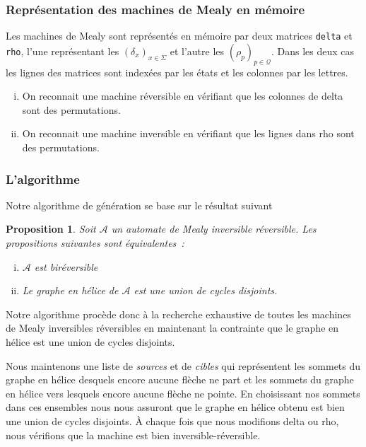 \documentclass[11pt,a4paper]{article}
\newtheorem{prop}{Proposition}
\begin{document}
\subsubsection*{Représentation des machines de Mealy en mémoire}
Les machines de Mealy sont représentés en mémoire par deux matrices \lstinline$delta$ et \lstinline{rho}, l'une représentant les $(\delta_x)_{x\in\Sigma}$ et l'autre les $(\rho_p)_{p\in\mathcal{Q}}$. Dans les deux cas les lignes des matrices sont indexées par les états et les colonnes par les lettres.

\begin{enumerate}[(i)]
\item On reconnait une machine réversible en vérifiant que les colonnes de \textrm{delta}  sont des permutations.
\item On reconnait une machine inversible en vérifiant que les lignes dans \textrm{rho} sont des permutations.
\end{enumerate}

\subsubsection*{L'algorithme}
Notre algorithme de génération se base sur le résultat suivant

\begin{prop}{\cite{DBLP:journals/corr/abs-1105-4725}}
  \label{thm:ir-helix}
  Soit $\mathcal{A}$ un automate de Mealy inversible réversible. Les propositions suivantes sont équivalentes~:

  \begin{enumerate}[(i)]
  \item $\mathcal{A}$ est biréversible
  \item Le graphe en hélice de $\mathcal{A}$ est une union de cycles disjoints.
  \end{enumerate}
\end{prop}

Notre algorithme procède donc à la recherche exhaustive de toutes les machines de Mealy inversibles réversibles en maintenant la contrainte que le graphe en hélice est une union de cycles disjoints.

Nous maintenons une liste de \textit{sources} et de \textit{cibles} qui représentent les sommets du graphe en hélice desquels encore aucune flèche ne part et les sommets du graphe en hélice vers lesquels encore aucune flèche ne pointe. En choisissant nos sommets dans ces ensembles nous nous assuront que le graphe en hélice obtenu est bien une union de cycles disjoints. À chaque fois que nous modifions \textrm{delta} ou \textrm{rho}, nous vérifions que la machine est bien inversible-réversible.
\end{document}
